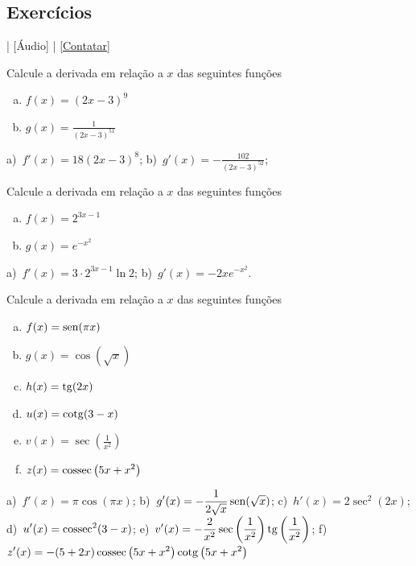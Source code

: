 \subsection*{Exercícios}

\begin{flushright}
  [Vídeo] | [Áudio] | \href{https://phkonzen.github.io/notas/contato.html}{[Contatar]}
\end{flushright}

\begin{ex}
  Calcule a derivada em relação a $x$ das seguintes funções
  \begin{enumerate}[a)]
  \item $\displaystyle f(x) = (2x-3)^{9}$
  \item $\displaystyle g(x) = \frac{1}{(2x-3)^{51}}$
  \end{enumerate}
\end{ex}
\begin{resp}
  a)~$\displaystyle f'(x) = 18(2x-3)^8$; b)~$\displaystyle g'(x) = -\frac{102}{(2x-3)^{52}}$;
\end{resp}

\begin{ex}
  Calcule a derivada em relação a $x$ das seguintes funções
  \begin{enumerate}[a)]
  \item $\displaystyle f(x) = 2^{3x-1}$
  \item $\displaystyle g(x) = e^{-x^2}$
  \end{enumerate}
\end{ex}
\begin{resp}
  a)~$\displaystyle f'(x) = 3\cdot 2^{3x-1}\ln 2$; b)~$\displaystyle g'(x) = -2xe^{-x^2}$.
\end{resp}

\begin{ex}
  Calcule a derivada em relação a $x$ das seguintes funções
  \begin{enumerate}[a)]
  \item $\displaystyle f(x) = \operatorname{sen}(\pi x)$
  \item $\displaystyle g(x) = \cos(\sqrt{x})$
  \item $\displaystyle h(x) = \operatorname{tg}(2x)$
  \item $\displaystyle u(x) = \operatorname{cotg}(3 - x)$
  \item $\displaystyle v(x) = \sec\left(\frac{1}{x^2}\right)$
  \item $\displaystyle z(x) = \operatorname{cossec}\left(5x + x^2\right)$
  \end{enumerate}
\end{ex}
\begin{resp}
  a)~$\displaystyle f'(x) = \pi\cos(\pi x)$; b)~$\displaystyle g'(x) = -\frac{1}{2\sqrt{x}}\operatorname{sen}(\sqrt{x})$; c)~$\displaystyle h'(x) = 2\sec^2(2x)$; d)~$\displaystyle u'(x) = \operatorname{cossec}^2(3-x)$; e)~$\displaystyle v'(x) = -\frac{2}{x^2}\sec\left(\frac{1}{x^2}\right)\operatorname{tg}\left(\frac{1}{x^2}\right)$; f)~$\displaystyle z'(x) = -(5+2x)\operatorname{cossec}\left(5x + x^2\right)\operatorname{cotg}\left(5x + x^2\right)$
\end{resp}

